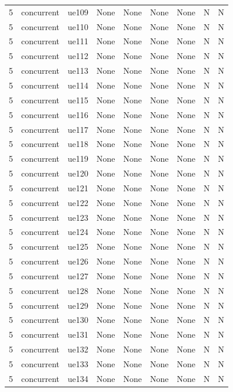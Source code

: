 \begin{table}[ht]
\begin{tabular}{|c|c|c|c|c|c|c|c|c|}
5 & concurrent & ue109 & None & None & None & None & N & N \\
5 & concurrent & ue110 & None & None & None & None & N & N \\
5 & concurrent & ue111 & None & None & None & None & N & N \\
5 & concurrent & ue112 & None & None & None & None & N & N \\
5 & concurrent & ue113 & None & None & None & None & N & N \\
5 & concurrent & ue114 & None & None & None & None & N & N \\
5 & concurrent & ue115 & None & None & None & None & N & N \\
5 & concurrent & ue116 & None & None & None & None & N & N \\
5 & concurrent & ue117 & None & None & None & None & N & N \\
5 & concurrent & ue118 & None & None & None & None & N & N \\
5 & concurrent & ue119 & None & None & None & None & N & N \\
5 & concurrent & ue120 & None & None & None & None & N & N \\
5 & concurrent & ue121 & None & None & None & None & N & N \\
5 & concurrent & ue122 & None & None & None & None & N & N \\
5 & concurrent & ue123 & None & None & None & None & N & N \\
5 & concurrent & ue124 & None & None & None & None & N & N \\
5 & concurrent & ue125 & None & None & None & None & N & N \\
5 & concurrent & ue126 & None & None & None & None & N & N \\
5 & concurrent & ue127 & None & None & None & None & N & N \\
5 & concurrent & ue128 & None & None & None & None & N & N \\
5 & concurrent & ue129 & None & None & None & None & N & N \\
5 & concurrent & ue130 & None & None & None & None & N & N \\
5 & concurrent & ue131 & None & None & None & None & N & N \\
5 & concurrent & ue132 & None & None & None & None & N & N \\
5 & concurrent & ue133 & None & None & None & None & N & N \\
5 & concurrent & ue134 & None & None & None & None & N & N \\

\end{tabular}
\end{table}

